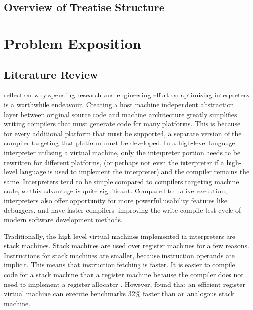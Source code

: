 				
	\section{Overview of Treatise Structure}

\chapter{Problem Exposition}
	\section{Literature Review}
		\cite{structureinterpreters} reflect on why spending research and engineering effort on optimising interpreters is a worthwhile endeavour. Creating a host machine independent abstraction layer between original source code and machine architecture greatly simplifies writing compilers that must generate code for many platforms. This is because for every additional platform that must be supported, a separate version of the compiler targeting that platform must be developed. In a high-level language interpreter utilising a virtual machine, only the interpreter portion needs to be rewritten for different platforms, (or perhaps not even the interpreter if a high-level language is used to implement the interpreter) and the compiler remains the same. Interpreters tend to be simple compared to compilers targeting machine code, so this advantage is quite significant. Compared to native execution, interpreters also offer opportunity for more powerful usability features like debuggers, and have faster compilers, improving the write-compile-test cycle of modern software development methods.
		
		Traditionally, the high level virtual machines implemented in interpreters are stack machines. Stack machines are used over register machines for a few reasons. Instructions for stack machines are smaller, because instruction operands are implicit. This means that instruction fetching is faster. It is easier to compile code for a stack machine than a register machine because the compiler does not need to implement a register allocator \citep{caseregistervm}. However, \cite{stackregistershowdown} found that an efficient register virtual machine can execute benchmarks 32\% faster than an analogous stack machine. 
		
